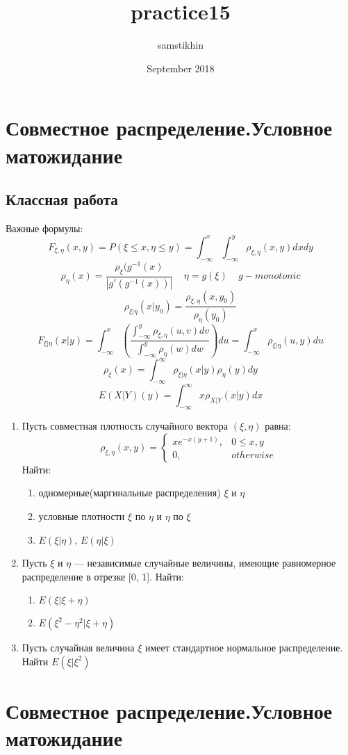 \documentclass[a4paper, 14pt]{extarticle}
\title{practice15}
\author{samstikhin}
\date{September 2018}
\begin{document}
\section*{Совместное распределение.Условное матожидание}
\subsection*{Классная работа}
Важные формулы:
$$F_{\xi,\eta}(x,y) = P(\xi \leq x, \eta \leq y) = \int_{-\infty}^{x}\int_{-\infty}^{y}\rho_{\xi,\eta}(x,y)dxdy$$
$$\rho_{\eta}(x) = \frac{\rho_{\xi}(g^{-1}(x)}{|g'(g^{-1}(x))|}~~~~~\eta = g(\xi)~~~~~g - monotonic$$
$$\rho_{\xi|\eta}(x|y_0) = \frac{\rho_{\xi,\eta}(x, y_0)}{\rho_{\eta}(y_0)}$$
$$F_{\xi|\eta}(x|y) = \int_{-\infty}^{x} (\frac{\int_{-\infty}^{y}\rho_{\xi,\eta}(u,v)dv}{\int_{-\infty}^{y}\rho_{\eta}(w)dw})du = 
\int_{-\infty}^{x}\rho_{\xi|\eta}(u,y)du$$
$$\rho_{\xi}(x) = \int_{-\infty}^{\infty} \rho_{\xi|\eta}(x|y)\rho_{\eta}(y)dy$$
$$E(X|Y)(y) = \int_{-\infty}^{\infty}x\rho_{X|Y}(x|y)dx$$
\begin{enumerate}
\item Пусть совместная плотность случайного вектора $(\xi, \eta)$ равна:
$$\rho_{\xi,\eta}(x,y) =\left\{
	\begin{array}{cc}
	xe^{-x(y+1)}, & 0\leq x,y\\
	0, & otherwise
	\end{array}\right.$$
Найти:
\begin{enumerate}
\item одномерные(маргинальные распределения) $\xi$ и $\eta$
\item условные плотности $\xi$ по $\eta$ и $\eta$ по $\xi$
\item $E(\xi|\eta)$, $E(\eta|\xi)$
\end{enumerate}

\item Пусть $\xi$ и $\eta$ — независимые случайные величины, имеющие
равномерное распределение в отрезке [0, 1]. Найти:
\begin{enumerate}
\item $E(\xi|\xi + \eta)$
\item $E(\xi^2 - \eta^2 |\xi + \eta)$
\end{enumerate}

\item Пусть случайная величина $\xi$ имеет стандартное нормальное
распределение. Найти $E(\xi|\xi^2)$
\end{enumerate}
\newpage

\section*{Совместное распределение.Условное матожидание}
\end{document}
